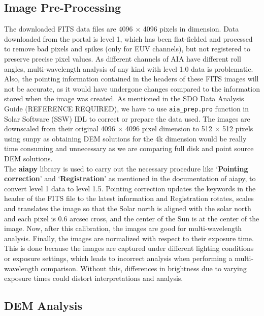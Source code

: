 \subsection{Image Pre-Processing}
\label{sec:data_pre_processing}

The downloaded FITS data files are 4096 $\times$ 4096 pixels in dimension. Data downloaded from the portal is level 1, which has been flat-fielded and processed to remove bad pixels and spikes (only for EUV channels), but not registered to preserve precise pixel values. As different channels of AIA have different roll angles, multi-wavelength analysis of any kind with level 1.0 data is problematic. Also, the pointing information contained in the headers of these FITS images will not be accurate, as it would have undergone changes compared to the information stored when the image was created. As mentioned in the SDO Data Analysis Guide (REFERENCE REQUIRED), we have to use \texttt{aia\_prep.pro} function in Solar Software (SSW) IDL to correct or prepare the data used. The images are downscaled from their original 4096 $\times$ 4096 pixel dimension to 512 $\times$ 512 pixels using sunpy as obtaining DEM solutions for the 4k dimension would be really time consuming and unnecessary as we are comparing full disk and point source DEM solutions.\\

The \textbf{aiapy} library is used to carry out the necessary procedure like `\textbf{Pointing correction}' and `\textbf{Registration}' as mentioned in the documentation of aiapy, to convert level 1 data to level 1.5. Pointing correction updates the keywords in the header of the FITS file to the latest information and Registration rotates, scales and translates the image so that the Solar north is aligned with the solar north and each pixel is 0.6 arcsec cross, and the center of the Sun is at the center of the image. Now, after this calibration, the images are good for multi-wavelength analysis. Finally, the images are normalized with respect to their exposure time. This is done because the images are captured under different lighting conditions or exposure settings, which leads to incorrect analysis when performing a multi-wavelength comparison. Without this, differences in brightness due to varying exposure times could distort interpretations and analysis.

\subsection{DEM Analysis}
\label{sec:dem_analysis}

